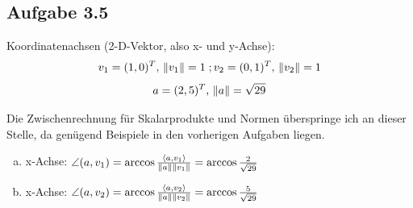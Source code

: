 \documentclass{standalone}
\begin{document}
\subsection{Aufgabe 3.5}
Koordinatenachsen (2-D-Vektor, also x- und y-Achse):
$$ v_1 = (1,0)^T,\, \left\lVert v_1\right\rVert = 1 \; ; v_2 = (0,1)^T,\,\left\lVert v_2\right\rVert = 1$$
$$a = (2,5)^T, \, \left\lVert a\right\rVert = \sqrt{29}$$

Die Zwischenrechnung für Skalarprodukte und Normen überspringe ich an dieser Stelle, da genügend Beispiele in den vorherigen Aufgaben liegen.
\begin{enumerate}[a)]
    \item x-Achse: $\angle(a, v_1) = \arccos \frac{\langle a,v_1\rangle}{\left\lVert a\right\rVert\left\lVert v_1\right\rVert}
    = \arccos \frac{2}{\sqrt{29}}$
    \item x-Achse: $\angle(a, v_2) = \arccos \frac{\langle a,v_2\rangle}{\left\lVert a\right\rVert\left\lVert v_2\right\rVert}
    = \arccos \frac{5}{\sqrt{29}}$
\end{enumerate}
\end{document}
